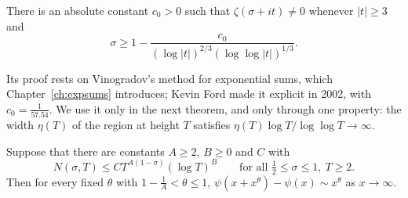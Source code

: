 \begin{theorem}\label{thm:vk}
There is an absolute constant $c_0>0$ such that $\zeta(\sigma+it)\ne0$ whenever $|t|\ge3$ and
\[
\sigma\ge1-\frac{c_0}{(\log|t|)^{2/3}(\log\log|t|)^{1/3}}.
\]
\end{theorem}

Its proof rests on Vinogradov's method for exponential sums, which Chapter~\ref{ch:expsums} introduces; Kevin Ford made it explicit in 2002, with $c_0=\frac1{57.54}$. We use it only in the next theorem, and only through one property: the width $\eta(T)$ of the region at height $T$ satisfies $\eta(T)\log T/\log\log T\to\infty$.

\begin{theorem}[Ingham, 1937]\label{thm:ingham}
Suppose that there are constants $A\ge2$, $B\ge0$ and $C$ with
\[
N(\sigma,T)\le CT^{A(1-\sigma)}(\log T)^B\qquad\text{for all }\tfrac12\le\sigma\le1,\ T\ge2.
\]
Then for every fixed $\theta$ with $1-\frac1A<\theta\le1$, $\psi(x+x^\theta)-\psi(x)\sim x^\theta$ as $x\to\infty$.
\end{theorem}

